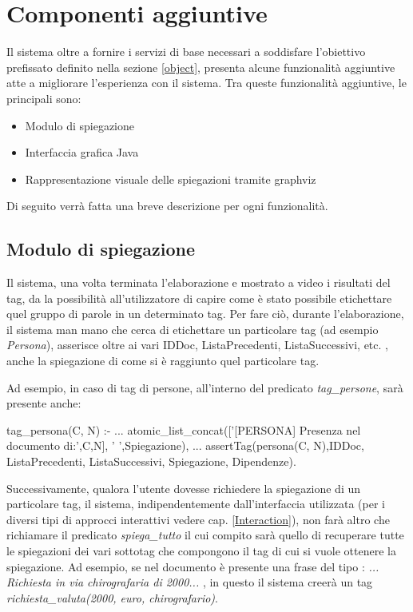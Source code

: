 
\section{Componenti aggiuntive}
Il sistema oltre a fornire i servizi di base necessari a soddisfare l'obiettivo prefissato definito nella sezione \ref{object}, presenta alcune funzionalità aggiuntive atte a migliorare l'esperienza con il sistema. Tra queste funzionalità aggiuntive, le principali sono:
\begin{itemize}
	\item Modulo di spiegazione
	\item Interfaccia grafica Java
	\item Rappresentazione visuale delle spiegazioni tramite graphviz
\end{itemize}
Di seguito verrà fatta una breve descrizione per ogni funzionalità.

\subsection{Modulo di spiegazione}
\label{spiega}
Il sistema, una volta terminata l'elaborazione e mostrato a video i risultati del tag, da la possibilità all'utilizzatore di capire come è stato possibile etichettare quel gruppo di parole in un determinato tag. Per fare ciò, durante l'elaborazione, il sistema man mano che cerca di etichettare un particolare tag (ad esempio \emph{Persona}), asserisce oltre ai vari IDDoc, ListaPrecedenti, ListaSuccessivi, etc. , anche la spiegazione di come si è raggiunto quel particolare tag.

Ad esempio, in caso di tag di persone, all'interno del predicato \emph{tag\_persone}, sarà presente anche:

\begin{prologcode}
 tag_persona(C, N) :-
   ...
   atomic_list_concat(['[PERSONA] Presenza nel documento di:',C,N],
                      ' ',Spiegazione),
   ...
   assertTag(persona(C, N),IDDoc, ListaPrecedenti, ListaSuccessivi,
            Spiegazione, Dipendenze).
\end{prologcode}

Successivamente, qualora l'utente dovesse richiedere la spiegazione di un particolare tag, il sistema, indipendentemente dall'interfaccia utilizzata (per i diversi tipi di approcci interattivi vedere cap. \ref{Interaction}), non farà altro che richiamare il predicato \emph{spiega\_tutto} il cui compito sarà quello di recuperare tutte le spiegazioni dei vari sottotag che compongono il tag di cui si vuole ottenere la spiegazione.
Ad esempio, se nel documento è presente una frase del tipo : \emph{... Richiesta in via chirografaria di 2000\officialeuro ...} , in questo il sistema creerà un tag \emph{richiesta\_valuta(2000, euro, chirografario)}.


